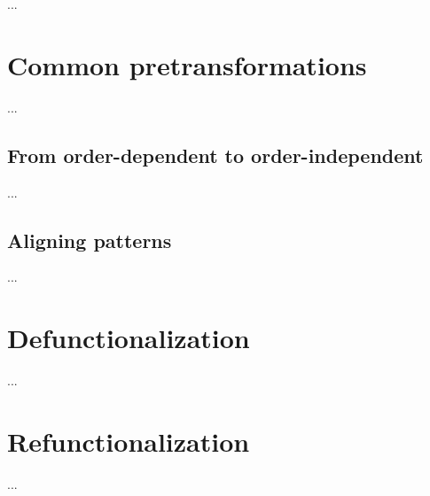 ...

\section{Common pretransformations}

...

\subsection{From order-dependent to order-independent}

...

\subsection{Aligning patterns}

...


\section{Defunctionalization}

...

\section{Refunctionalization}

...

